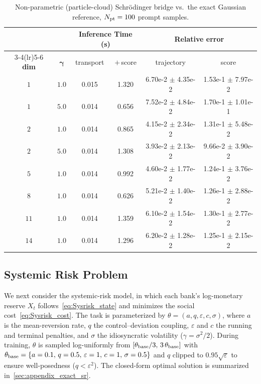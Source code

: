\documentclass[preprint]{elsarticle}
\newcommand{\g}{\gamma}
\begin{document}
\begin{table}[htpb]
    \centering
    \caption{Non-parametric (particle-cloud) Schr\"odinger bridge vs.\ the exact
    Gaussian reference, $N_{\rm pt}=100$ prompt samples. 
    }
    \label{tab:nonparam_sb_error}
    \begin{tabular}{cccccc}
        \toprule
         &  & \multicolumn{2}{c}{\textbf{Inference Time (s)}}
            & \multicolumn{2}{c}{\textbf{Relative error}} \\
        \cmidrule(lr){3-4}\cmidrule(lr){5-6}
        \textbf{dim} & $\boldsymbol{\g}$ & transport & $+$\,score
            & trajectory & score \\
        \midrule
        $1$  & $1.0$ & 0.015 & 1.320 & 6.70e-2 $\pm$ 4.35e-2 & 1.53e-1 $\pm$ 7.97e-2 \\
        $1$  & $5.0$ & 0.014 & 0.656 & 7.52e-2 $\pm$ 4.84e-2 & 1.70e-1 $\pm$ 1.01e-1 \\
        \midrule
        $2$  & $1.0$ & 0.014 & 0.865 & 4.15e-2 $\pm$ 2.34e-2 & 1.31e-1 $\pm$ 5.48e-2 \\
        $2$  & $5.0$ & 0.014 & 1.308 & 3.93e-2 $\pm$ 2.13e-2 & 9.66e-2 $\pm$ 3.90e-2 \\
        \midrule
        $5$  & $1.0$ & 0.014 & 0.992 & 4.60e-2 $\pm$ 1.77e-2 & 1.24e-1 $\pm$ 3.76e-2 \\
        $8$  & $1.0$ & 0.014 & 0.626 & 5.21e-2 $\pm$ 1.40e-2 & 1.26e-1 $\pm$ 2.88e-2 \\
        $11$ & $1.0$ & 0.014 & 1.359 & 6.10e-2 $\pm$ 1.54e-2 & 1.30e-1 $\pm$ 2.77e-2 \\
        $14$ & $1.0$ & 0.014 & 1.296 & 6.20e-2 $\pm$ 1.28e-2 & 1.25e-1 $\pm$ 2.15e-2 \\
        \bottomrule
    \end{tabular}
\end{table}

\subsection{Systemic Risk Problem}
\label{sec:exp_sr1}

We next consider the systemic-risk model, in which each bank's log-monetary reserve $X_t$ follows~\eqref{eq:Sysrisk_state} and minimizes the social cost~\eqref{eq:Sysrisk_cost}. The task is parameterized by $\theta=(a,q,\varepsilon,c,\sigma)$, where $a$ is the mean-reversion rate, $q$ the control--deviation coupling, $\varepsilon$ and $c$ the running and terminal penalties, and $\sigma$ the idiosyncratic volatility ($\gamma=\sigma^2/2$). During training, $\theta$ is sampled log-uniformly from $[\theta_{\rm base}/3,\,3\,\theta_{\rm base}]$ with $\theta_{\rm base}=\{a=0.1,\,q=0.5,\,\varepsilon=1,\,c=1,\,\sigma=0.5\}$ and $q$ clipped to $0.95\sqrt{\varepsilon}$ to ensure well-posedness ($q<\varepsilon^2$). The closed-form optimal solution is summarized in~\ref{sec:appendix_exact_sr}.
\end{document}
